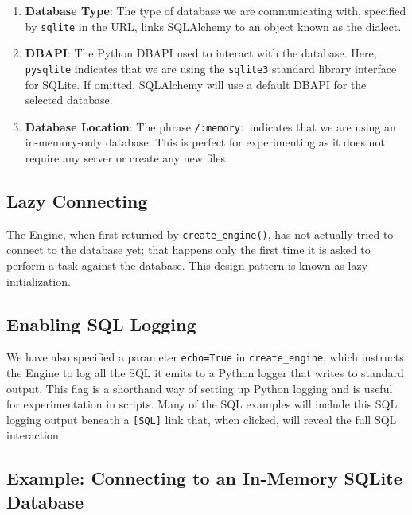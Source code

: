 \documentclass[
  letterpaper,
  DIV=11,
  numbers=noendperiod]{scrreprt}
\providecommand{\tightlist}{%
  \setlength{\itemsep}{0pt}\setlength{\parskip}{0pt}}\usepackage{longtable,booktabs,array}
\begin{document}
\begin{enumerate}
\def\labelenumi{\arabic{enumi}.}
\tightlist
\item
  \textbf{Database Type}: The type of database we are communicating
  with, specified by \texttt{sqlite} in the URL, links SQLAlchemy to an
  object known as the dialect.
\item
  \textbf{DBAPI}: The Python DBAPI used to interact with the database.
  Here, \texttt{pysqlite} indicates that we are using the
  \texttt{sqlite3} standard library interface for SQLite. If omitted,
  SQLAlchemy will use a default DBAPI for the selected database.
\item
  \textbf{Database Location}: The phrase \texttt{/:memory:} indicates
  that we are using an in-memory-only database. This is perfect for
  experimenting as it does not require any server or create any new
  files.
\end{enumerate}

\subsection{Lazy Connecting}\label{lazy-connecting}

The Engine, when first returned by \texttt{create\_engine()}, has not
actually tried to connect to the database yet; that happens only the
first time it is asked to perform a task against the database. This
design pattern is known as lazy initialization.

\subsection{Enabling SQL Logging}\label{enabling-sql-logging}

We have also specified a parameter \texttt{echo=True} in
\texttt{create\_engine}, which instructs the Engine to log all the SQL
it emits to a Python logger that writes to standard output. This flag is
a shorthand way of setting up Python logging and is useful for
experimentation in scripts. Many of the SQL examples will include this
SQL logging output beneath a \texttt{{[}SQL{]}} link that, when clicked,
will reveal the full SQL interaction.

\subsection{Example: Connecting to an In-Memory SQLite
Database}\label{example-connecting-to-an-in-memory-sqlite-database}
\end{document}

